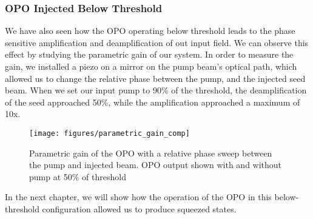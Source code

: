 \subsubsection{OPO Injected Below Threshold} 
\label{opo_injected_below_threshold} 

We have also seen how the OPO operating below threshold leads to the phase sensitive amplification and deamplification of out input field.  We can observe this effect by studying the parametric gain of our system.   In order to measure the gain, we installed a piezo on a mirror on the pump beam's optical path, which allowed us to change the relative phase between the pump, and the injected seed beam.  When we set our input pump to 90\% of the threshold, the deamplification of the seed approached 50\%, while the amplification approached a maximum of 10x.


\begin{figure}[ht] 
 \centering  
 \texttt{[image: figures/parametric\_gain\_comp]} 
 \caption[Below-threshold parametric gain]{Parametric gain of the OPO with a relative phase sweep between the pump and injected beam.  OPO output shown with and without pump at 50\% of threshold} 
 \label{fig:parametric_gain_comp} 
\end{figure}


In the next chapter, we will show how the operation of the OPO in this below-threshold configuration allowed us to produce squeezed states.
